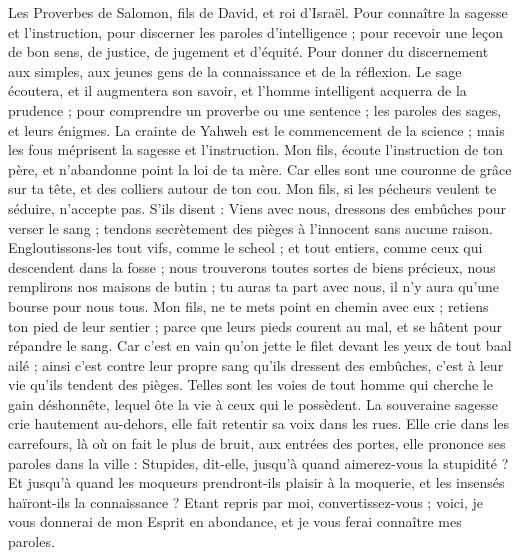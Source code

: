 \begin{multicols}{2}
\TextTitle{[But du livre : connaître la sagesse}
\VerseOne{}Les Proverbes de Salomon, fils de David, et roi d'Israël.
Pour connaître la sagesse et l'instruction, pour discerner les paroles d'intelligence ;
pour recevoir une leçon de bon sens, de justice, de jugement et d'équité.
Pour donner du discernement aux simples, aux jeunes gens de la connaissance et de la réflexion.
Le sage écoutera, et il augmentera son savoir, et l'homme intelligent acquerra de la prudence ;
pour comprendre un proverbe ou une sentence ; les paroles des sages, et leurs énigmes.
\TextTitle{[Le fondement de la sagesse : la crainte de Dieu}
La crainte de Yahweh est le commencement de la science ; mais les fous méprisent la sagesse et l'instruction.
Mon fils, écoute l'instruction de ton père, et n'abandonne point la loi de ta mère.
Car elles sont une couronne de grâce sur ta tête, et des colliers autour de ton cou.
Mon fils, si les pécheurs veulent te séduire, n'accepte pas.
S'ils disent : Viens avec nous, dressons des embûches pour verser le sang ; tendons secrètement des pièges à l'innocent sans aucune raison.
Engloutissons-les tout vifs, comme le scheol ; et tout entiers, comme ceux qui descendent dans la fosse ;
nous trouverons toutes sortes de biens précieux, nous remplirons nos maisons de butin ;
tu auras ta part avec nous, il n'y aura qu'une bourse pour nous tous.
Mon fils, ne te mets point en chemin avec eux ; retiens ton pied de leur sentier ;
parce que leurs pieds courent au mal, et se hâtent pour répandre le sang.
Car c'est en vain qu'on jette le filet devant les yeux de tout baal ailé ;
ainsi c'est contre leur propre sang qu'ils dressent des embûches, c'est à leur vie qu'ils tendent des pièges.
Telles sont les voies de tout homme qui cherche le gain déshonnête, lequel ôte la vie à ceux qui le possèdent.
La souveraine sagesse crie hautement au-dehors, elle fait retentir sa voix dans les rues.
Elle crie dans les carrefours, là où on fait le plus de bruit, aux entrées des portes, elle prononce ses paroles dans la ville :
Stupides, dit-elle, jusqu'à quand aimerez-vous la stupidité ? Et jusqu'à quand les moqueurs prendront-ils plaisir à la moquerie, et les insensés haïront-ils la connaissance ?
Etant repris par moi, convertissez-vous ; voici, je vous donnerai de mon Esprit en abondance, et je vous ferai connaître mes paroles.

\end{multicols}
